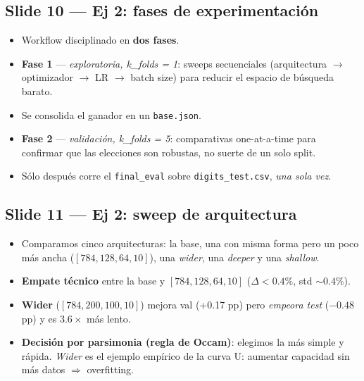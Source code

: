 \documentclass[11pt,a4paper]{article}
\begin{document}
\subsection{Slide 10 — Ej 2: fases de experimentación}

\begin{decir}
\begin{itemize}[leftmargin=*,topsep=0pt]
  \item Workflow disciplinado en \textbf{dos fases}.
  \item \textbf{Fase 1} — \emph{exploratoria, k\_folds = 1}: sweeps secuenciales
        (arquitectura $\to$ optimizador $\to$ LR $\to$ batch size) para reducir
        el espacio de búsqueda barato.
  \item Se consolida el ganador en un \texttt{base.json}.
  \item \textbf{Fase 2} — \emph{validación, k\_folds = 5}: comparativas one-at-a-time
        para confirmar que las elecciones son robustas, no suerte de un solo split.
  \item Sólo después corre el \texttt{final\_eval} sobre \texttt{digits\_test.csv},
        \emph{una sola vez}.
\end{itemize}
\end{decir}

\subsection{Slide 11 — Ej 2: sweep de arquitectura}

\begin{decir}
\begin{itemize}[leftmargin=*,topsep=0pt]
  \item Comparamos cinco arquitecturas: la base, una con misma forma pero un poco
        más ancha ($[784, 128, 64, 10]$), una \emph{wider}, una \emph{deeper} y
        una \emph{shallow}.
  \item \textbf{Empate técnico} entre la base y $[784, 128, 64, 10]$
        ($\Delta < 0.4\%$, std $\sim 0.4\%$).
  \item \textbf{Wider} ($[784, 200, 100, 10]$) mejora val (+0.17 pp) pero
        \emph{empeora test} ($-0.48$ pp) y es $3.6\times$ más lento.
  \item \textbf{Decisión por parsimonia (regla de Occam)}: elegimos la más simple
        y rápida. \emph{Wider} es el ejemplo empírico de la curva U: aumentar
        capacidad sin más datos $\Rightarrow$ overfitting.
\end{itemize}
\end{decir}
\end{document}
